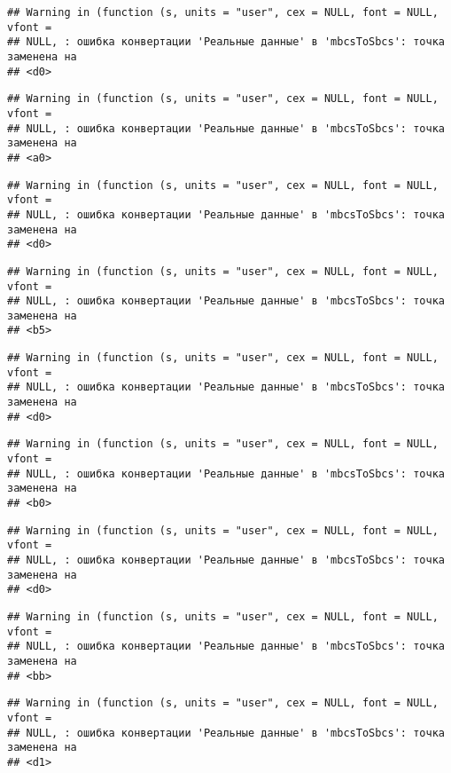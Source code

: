 \documentclass[
]{article}
\begin{document}
\begin{verbatim}
## Warning in (function (s, units = "user", cex = NULL, font = NULL, vfont =
## NULL, : ошибка конвертации 'Реальные данные' в 'mbcsToSbcs': точка заменена на
## <d0>
\end{verbatim}

\begin{verbatim}
## Warning in (function (s, units = "user", cex = NULL, font = NULL, vfont =
## NULL, : ошибка конвертации 'Реальные данные' в 'mbcsToSbcs': точка заменена на
## <a0>
\end{verbatim}

\begin{verbatim}
## Warning in (function (s, units = "user", cex = NULL, font = NULL, vfont =
## NULL, : ошибка конвертации 'Реальные данные' в 'mbcsToSbcs': точка заменена на
## <d0>
\end{verbatim}

\begin{verbatim}
## Warning in (function (s, units = "user", cex = NULL, font = NULL, vfont =
## NULL, : ошибка конвертации 'Реальные данные' в 'mbcsToSbcs': точка заменена на
## <b5>
\end{verbatim}

\begin{verbatim}
## Warning in (function (s, units = "user", cex = NULL, font = NULL, vfont =
## NULL, : ошибка конвертации 'Реальные данные' в 'mbcsToSbcs': точка заменена на
## <d0>
\end{verbatim}

\begin{verbatim}
## Warning in (function (s, units = "user", cex = NULL, font = NULL, vfont =
## NULL, : ошибка конвертации 'Реальные данные' в 'mbcsToSbcs': точка заменена на
## <b0>
\end{verbatim}

\begin{verbatim}
## Warning in (function (s, units = "user", cex = NULL, font = NULL, vfont =
## NULL, : ошибка конвертации 'Реальные данные' в 'mbcsToSbcs': точка заменена на
## <d0>
\end{verbatim}

\begin{verbatim}
## Warning in (function (s, units = "user", cex = NULL, font = NULL, vfont =
## NULL, : ошибка конвертации 'Реальные данные' в 'mbcsToSbcs': точка заменена на
## <bb>
\end{verbatim}

\begin{verbatim}
## Warning in (function (s, units = "user", cex = NULL, font = NULL, vfont =
## NULL, : ошибка конвертации 'Реальные данные' в 'mbcsToSbcs': точка заменена на
## <d1>
\end{verbatim}
\end{document}

